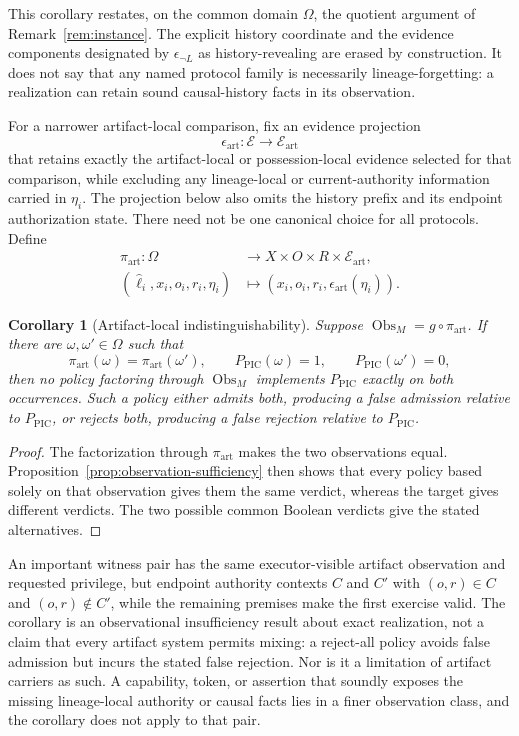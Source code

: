 \documentclass[10pt,twocolumn]{article}
\newtheorem{corollary}{Corollary}
\begin{document}
This corollary restates, on the common domain \(\Omega\), the quotient argument
of Remark~\ref{rem:instance}. The explicit history coordinate and the evidence
components designated by \(\epsilon_{\neg L}\) as history-revealing are erased
by construction. It does not say that any named protocol family is
necessarily lineage-forgetting: a realization can retain sound causal-history
facts in its observation.

For a narrower artifact-local comparison, fix an evidence projection
\[
\epsilon_{\mathrm{art}}:\mathcal E\longrightarrow\mathcal E_{\mathrm{art}}
\]
that retains exactly the artifact-local or possession-local evidence selected
for that comparison, while excluding any lineage-local or current-authority
information carried in \(\eta_i\). The projection below also omits the history
prefix and its endpoint authorization state. There need not be one canonical
choice for all protocols. Define
\[
\begin{aligned}
\pi_{\mathrm{art}}:\Omega
&\longrightarrow X\times O\times R\times\mathcal E_{\mathrm{art}},\\
(\widehat{\ell}_i,x_i,o_i,r_i,\eta_i)
&\longmapsto(x_i,o_i,r_i,\epsilon_{\mathrm{art}}(\eta_i)).
\end{aligned}
\]

\begin{corollary}[Artifact-local indistinguishability]
\label{cor:artifact-local}
Suppose \(\operatorname{Obs}_M=g\circ\pi_{\mathrm{art}}\). If there are
\(\omega,\omega'\in\Omega\) such that
\[
\pi_{\mathrm{art}}(\omega)=\pi_{\mathrm{art}}(\omega'),
\qquad
P_{\mathrm{PIC}}(\omega)=1,
\qquad
P_{\mathrm{PIC}}(\omega')=0,
\]
then no policy factoring through \(\operatorname{Obs}_M\) implements
\(P_{\mathrm{PIC}}\) exactly on both occurrences. Such a policy either admits
both, producing a false admission relative to \(P_{\mathrm{PIC}}\), or rejects
both, producing a false rejection relative to \(P_{\mathrm{PIC}}\).
\end{corollary}

\begin{proof}
The factorization through \(\pi_{\mathrm{art}}\) makes the two observations
equal. Proposition~\ref{prop:observation-sufficiency} then shows that every
policy based solely on that observation gives them the same verdict, whereas
the target gives different verdicts. The two possible common Boolean verdicts
give the stated alternatives.
\end{proof}

An important witness pair has the same executor-visible artifact observation
and requested privilege, but endpoint authority contexts \(C\) and \(C'\) with
\((o,r)\in C\) and \((o,r)\notin C'\), while the remaining premises make the
first exercise valid. The corollary is an observational insufficiency result
about exact realization, not a claim that every artifact system permits mixing: a
reject-all policy avoids false admission but incurs the stated false rejection.
Nor is it a limitation of artifact carriers as such. A capability, token, or
assertion that soundly exposes the missing lineage-local authority or causal
facts lies in a finer observation class, and the corollary does not apply to
that pair.
\end{document}
